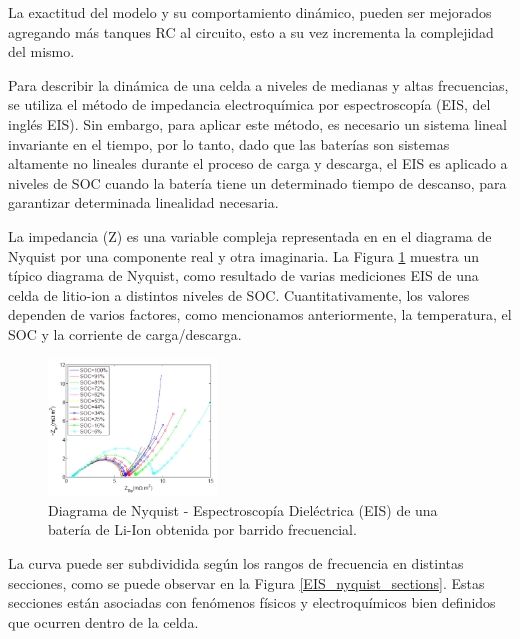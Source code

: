\documentclass[10pt,a4paper]{article}
\newcounter{subsubsubsection}[subsubsection]
\begin{document}
\noindent La exactitud del modelo y su comportamiento din\'amico, pueden ser 
mejorados agregando m\'as tanques RC al circuito, esto a su vez incrementa la
complejidad del mismo. 


\noindent Para describir la din\'amica de una celda a niveles de medianas y 
altas frecuencias, se utiliza el m\'etodo de impedancia electroqu\'imica por 
espectroscop\'ia (\acrshort{EIS}, del ingl\'es \acrlong{EIS}). Sin embargo, para
aplicar este m\'etodo, es necesario un sistema lineal invariante en el tiempo,
por lo tanto, dado que las bater\'ias son sistemas altamente no lineales durante
el proceso de carga y descarga, el \acrshort{EIS} es aplicado a niveles de
\acrshort{SOC} cuando la bater\'ia tiene un determinado tiempo de descanso, para
garantizar determinada linealidad necesaria.

\noindent La impedancia (Z) es una variable compleja representada en en el 
diagrama de Nyquist por una componente real y otra imaginaria. 
La Figura \ref{EIS_Nyquist} muestra un t\'ipico diagrama de Nyquist, 
como resultado de varias mediciones \acrshort{EIS} de una celda de litio-ion a
distintos niveles de \acrshort{SOC}. Cuantitativamente, los valores dependen de 
varios factores, como mencionamos anteriormente, la temperatura, 
el \acrshort{SOC} y la corriente de carga/descarga.

\begin{figure}[h!]
    \begin{center}
	\includegraphics[width=0.4\textwidth]{EIS_Nyquist.png}
	\caption{Diagrama de Nyquist - Espectroscopía Dieléctrica (EIS) de 
	una batería de Li-Ion obtenida por barrido frecuencial.}
	\label{EIS_Nyquist}
    \end{center}
\end{figure}

\newpage

\noindent La curva puede ser subdividida seg\'un los rangos de frecuencia en
distintas secciones, como se puede observar en la Figura
\ref{EIS_nyquist_sections}. Estas secciones est\'an asociadas con fen\'omenos 
f\'isicos y electroqu\'imicos bien definidos que ocurren dentro de la celda.
\end{document}
